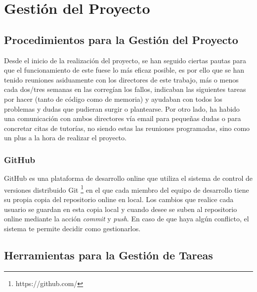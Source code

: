 \chapter{Gestión del Proyecto}
\label{cap:gestionProyecto}


\section{Procedimientos para la Gestión del Proyecto}
\label{cap:sec:procedimientosGestionProyecto}

Desde el inicio de la realización del proyecto, se han seguido ciertas pautas para que el funcionamiento de este fuese lo más eficaz posible, es por ello que se han tenido reuniones asiduamente con los directores de este trabajo, más o menos cada dos/tres semanas en las  corregían los fallos, indicaban las siguientes tareas por hacer (tanto de código como de memoria) y  ayudaban con todos los problemas y dudas que pudieran surgir o plantearse.
Por otro lado, ha habido una comunicación con ambos directores vía email para pequeñas dudas o para concretar citas de tutorías, no siendo estas las reuniones programadas, sino como un plus a la hora de realizar el proyecto.

\subsection{GitHub}

GitHub es una plataforma de desarrollo online que utiliza el sistema de control de versiones distribuido Git \footnote{https://github.com/} en el que cada miembro del equipo de desarrollo tiene su propia copia del repositorio online en local. Los cambios que realice cada usuario se guardan en esta copia local y cuando desee se suben al repositorio online mediante la acción \textit{commit} y \textit{push}. En caso de que haya algún conflicto, el sistema te permite decidir como gestionarlos. 
\section{Herramientas para la Gestión de Tareas}
\label{cap:sec:herramientasGestionTareas}

